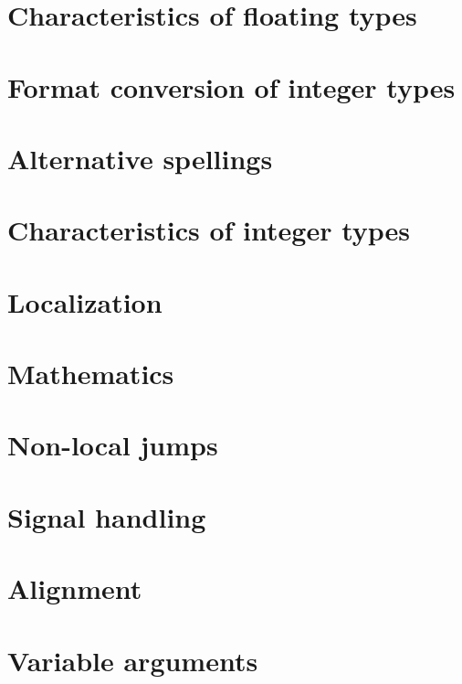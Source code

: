 \section{Characteristics of floating types }


\section{Format conversion of integer types }


\section{Alternative spellings }


\section{Characteristics of integer types }


\section{Localization }


\section{Mathematics }


\section{Non-local jumps }


\section{Signal handling }


\section{Alignment }


\section{Variable arguments }


